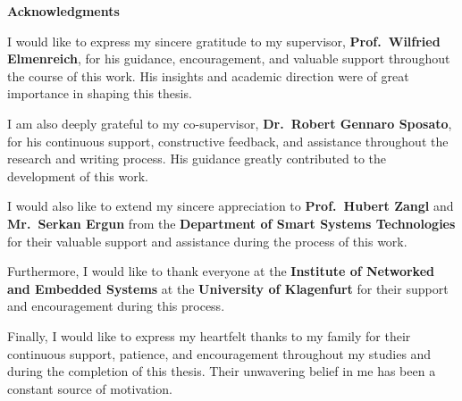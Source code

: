 \newpage
\vspace*{2.2 cm}
{\Large
\noindent
{\bf Acknowledgments}} \\
\vspace*{0.3 cm}


\noindent
I would like to express my sincere gratitude to my supervisor,
\textbf{Prof.\ Wilfried Elmenreich}, for his guidance, encouragement, and valuable
support throughout the course of this work. His insights and academic direction
were of great importance in shaping this thesis.

I am also deeply grateful to my co-supervisor,
\textbf{Dr.\ Robert Gennaro Sposato}, for his continuous support, constructive
feedback, and assistance throughout the research and writing process. His guidance
greatly contributed to the development of this work.

I would also like to extend my sincere appreciation to
\textbf{Prof.\ Hubert Zangl} and \textbf{Mr.\ Serkan Ergun} from the
\textbf{Department of Smart Systems Technologies} for their valuable support and
assistance during the process of this work.

Furthermore, I would like to thank everyone at the
\textbf{Institute of Networked and Embedded Systems} at the
\textbf{University of Klagenfurt} for their support and encouragement during this
process.

Finally, I would like to express my heartfelt thanks to my family for their
continuous support, patience, and encouragement throughout my studies and during
the completion of this thesis. Their unwavering belief in me has been a constant
source of motivation.

